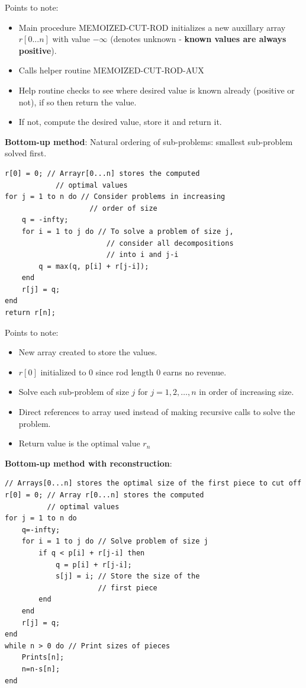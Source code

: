 \documentclass[10pt,a4paper]{article}
\begin{document}
Points to note:
\begin{itemize}
    \item Main procedure MEMOIZED-CUT-ROD initializes a new auxillary array $r[0...n]$ with value
    $-\infty$ (denotes unknown - \textbf{known values are always positive}). 
    \item Calls helper routine MEMOIZED-CUT-ROD-AUX
    \item Help routine checks to see where desired value is known already (positive or not), if so
    then return the value.
    \item If not, compute the desired value, store it and return it.
\end{itemize}

\pagebreak

\textbf{Bottom-up method}:
Natural ordering of sub-problems: smallest sub-problem solved first.
\begin{lstlisting}
r[0] = 0; // Arrayr[0...n] stores the computed 
            // optimal values
for j = 1 to n do // Consider problems in increasing 
                    // order of size
    q = -infty; 
    for i = 1 to j do // To solve a problem of size j, 
                        // consider all decompositions 
                        // into i and j-i 
        q = max(q, p[i] + r[j-i]);
    end 
    r[j] = q;
end 
return r[n];
\end{lstlisting}

Points to note:
\begin{itemize}
    \item New array created to store the values.
    \item $r[0]$ initialized to 0 since rod length $0$ earns no revenue.
    \item Solve each sub-problem of size $j$ for $j = 1,2,\dots,n$ in order of increasing size.
    \item Direct references to array used instead of making recursive calls to solve the problem.
    \item Return value is the optimal value $r_n$
\end{itemize}

\textbf{Bottom-up method with reconstruction}:
\begin{lstlisting}
// Arrays[0...n] stores the optimal size of the first piece to cut off
r[0] = 0; // Array r[0...n] stores the computed 
          // optimal values
for j = 1 to n do 
    q=-infty;
    for i = 1 to j do // Solve problem of size j
        if q < p[i] + r[j-i] then 
            q = p[i] + r[j-i];
            s[j] = i; // Store the size of the 
                      // first piece
        end 
    end 
    r[j] = q;
end
while n > 0 do // Print sizes of pieces
    Prints[n];
    n=n-s[n];
end
\end{lstlisting}
\end{document}
